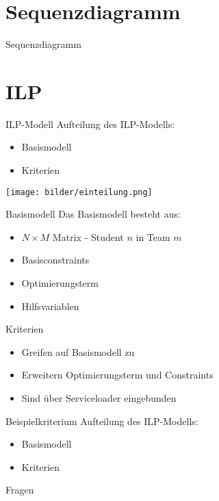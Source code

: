 \documentclass[18pt]{beamer}
\begin{document}
\section{Sequenzdiagramm} %
\begin{frame}{Sequenzdiagramm}
\end{frame}

\section{ILP}
\begin{frame}{ILP-Modell}
Aufteilung des ILP-Modells:
\begin{itemize}
  \item Basismodell
  \item Kriterien
\end{itemize}
\texttt{[image: bilder/einteilung.png]}
\end{frame}

\begin{frame}{Basismodell}
Das Basismodell besteht aus:
\begin{itemize}
  \item $N \times M$ Matrix - Student $n$ in Team $m$
  \item Basisconstraints 
  \item Optimierungsterm
  \item Hilfsvariablen
\end{itemize}
\end{frame}

\begin{frame}{Kriterien}
\begin{itemize}
  \item Greifen auf Basismodell zu
  \item Erweitern Optimierungsterm und Constraints
  \item Sind über Serviceloader eingebunden
\end{itemize}
\end{frame}

\begin{frame}{Beispielkriterium} %
Aufteilung des ILP-Modells:
\begin{itemize}
  \item Basismodell
  \item Kriterien
\end{itemize}

\end{frame}

\appendix
\beginbackup

\begin{frame}{Fragen}
\printbibliography
\end{frame}

\backupend
\end{document}
